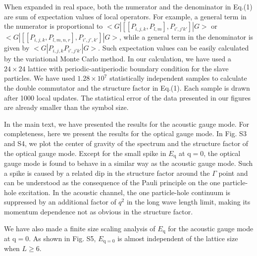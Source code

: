 \documentclass[12pt]{article}
\begin{document}
When expanded in real space, both the numerator and the denominator in Eq.(1) are sum of expectation values of local operators. For example, a general term in the numerator is proportional to 
$<G|[[P_{i,j,k},P_{l,m}],P_{i',j'k'}]|G>$ or $<G|[[P_{i,j,k},P_{l,m,n,r}],P_{i',j',k'}]|G>$, while a general term in the denominator is given by $<G|P_{i,j,k}P_{i',j'k'}|G>$. Such expectation values can be easily calculated by the variational Monte Carlo method. In our calculation, we have used a $24\times24$ lattice with periodic-antiperiodic boundary condition for the slave particles. We have used $1.28\times 10^{7}$ statistically independent samples to calculate the double commutator and the structure factor in Eq.(1). Each sample is drawn after 1000 local updates. The statistical error of the data presented in our figures are already smaller than the symbol size. 

In the main text, we have presented the results for the acoustic gauge mode. For completeness, here we present the results for the optical gauge mode. In Fig. S3 and S4, we plot the center of gravity of the spectrum and the structure factor of the optical gauge mode. Except for the small spike in $E_{\mathrm{q}}$ at $\mathrm{q}=0$, the optical gauge mode is found to behave in a similar way as the acoustic gauge mode. Such a spike is caused by a related dip in the structure factor around the $\Gamma$ point and can be understood as the consequence of the Pauli principle on the one particle-hole excitation. In the acoustic channel, the one particle-hole continuum is suppressed by an additional factor of $q^{2}$ in the long wave length limit, making its momentum dependence not as obvious in the structure factor.  

We have also made a finite size scaling analysis of $E_{\mathrm{q}}$ for the acoustic gauge mode at $\mathrm{q}=0$. As shown in Fig. S5, $E_{\mathrm{q=0}}$ is almost independent of the lattice size when $L\geq 6$.
\end{document}
